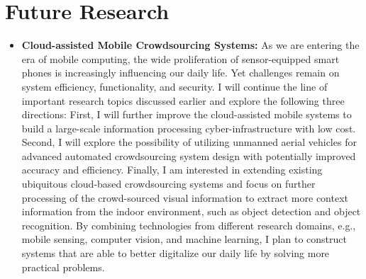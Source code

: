 \documentclass[11pt]{article}
\begin{document}

\section*{Future Research}
\begin{itemize}

\item
\textbf{Cloud-assisted Mobile Crowdsourcing Systems:} As we are entering the era of mobile computing, the wide proliferation of sensor-equipped smart phones is increasingly influencing our daily life. Yet challenges remain on system efficiency, functionality, and security. I will continue the line of important research topics discussed earlier and explore the following three directions: First, I will further improve the cloud-assisted mobile systems to build a large-scale information processing cyber-infrastructure with low cost. Second, I will explore the possibility of utilizing unmanned aerial vehicles for advanced automated crowdsourcing system design with potentially improved accuracy and efficiency. Finally, I am interested in extending existing ubiquitous cloud-based crowdsourcing systems and focus on further processing of the crowd-sourced visual information to extract more context information from the indoor environment, such as object detection and object recognition. By combining technologies from different research domains, e.g., mobile sensing, computer vision, and machine learning, I plan to construct systems that are able to better digitalize our daily life by solving more practical problems. 



\end{itemize}
\end{document}
